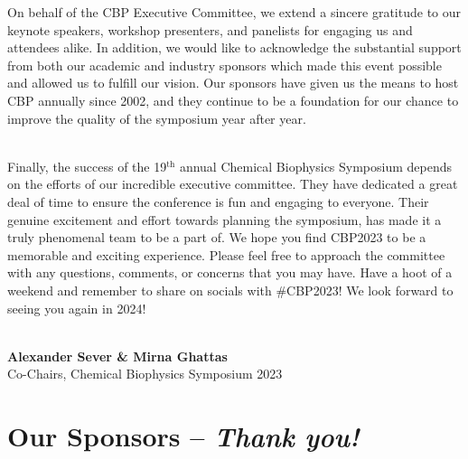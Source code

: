 \documentclass[titlepage,oneside,openany,10pt]{book}
\begin{document}
On behalf of the CBP Executive Committee, we extend a sincere gratitude to our keynote speakers, workshop presenters, and panelists for engaging us and attendees alike. In addition, we would like to acknowledge the substantial support from both our academic and industry sponsors which made this event possible and allowed us to fulfill our vision. Our sponsors have given us the means to host CBP annually since 2002, and they continue to be a foundation for our chance to improve the quality of the symposium year after year.\\\

Finally, the success of the 19$^{\textrm{th}}$ annual Chemical Biophysics Symposium depends on the efforts of our incredible executive committee. They have dedicated a great deal of time to ensure the conference is fun and engaging to everyone. Their genuine excitement and effort towards planning the symposium, has made it a truly phenomenal team to be a part of. We hope you find CBP2023 to be a memorable and exciting experience. Please feel free to approach the committee with any questions, comments, or concerns that you may have. Have a hoot of a weekend and remember to share on socials with \#CBP2023! We look forward to seeing you again in 2024!\\\

\textbf{Alexander Sever \& Mirna Ghattas}\\ 
Co-Chairs, Chemical Biophysics Symposium 2023


\chapter*{Our Sponsors -- \textit{Thank you!}}
\label{chapter:sponsors}
\end{document}
